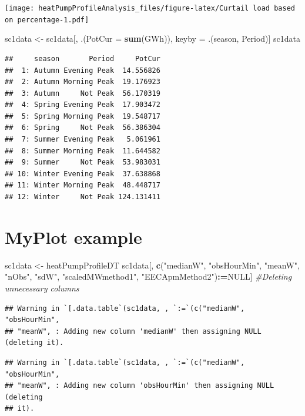 \documentclass[]{article}
\newenvironment{Shaded}{\begin{snugshade}}{\end{snugshade}}
\newcommand{\KeywordTok}[1]{\textcolor[rgb]{0.13,0.29,0.53}{\textbf{#1}}}
\newcommand{\DataTypeTok}[1]{\textcolor[rgb]{0.13,0.29,0.53}{#1}}
\newcommand{\StringTok}[1]{\textcolor[rgb]{0.31,0.60,0.02}{#1}}
\newcommand{\CommentTok}[1]{\textcolor[rgb]{0.56,0.35,0.01}{\textit{#1}}}
\newcommand{\OtherTok}[1]{\textcolor[rgb]{0.56,0.35,0.01}{#1}}
\newcommand{\OperatorTok}[1]{\textcolor[rgb]{0.81,0.36,0.00}{\textbf{#1}}}
\newcommand{\ErrorTok}[1]{\textcolor[rgb]{0.64,0.00,0.00}{\textbf{#1}}}
\newcommand{\NormalTok}[1]{#1}
\theoremstyle{definition}
\theoremstyle{definition}
\theoremstyle{definition}
\theoremstyle{remark}
\begin{document}
\texttt{[image: heatPumpProfileAnalysis\_files/figure-latex/Curtail load based on percentage-1.pdf]}

\begin{Shaded}
\begin{Highlighting}[]
\NormalTok{sc1data <-}\StringTok{ }\NormalTok{sc1data[, .(}\DataTypeTok{PotCur =} \KeywordTok{sum}\NormalTok{(GWh)),}
\NormalTok{                   keyby =}\StringTok{ }\NormalTok{.(season, Period)]}
\NormalTok{sc1data}
\end{Highlighting}
\end{Shaded}

\begin{verbatim}
##     season       Period     PotCur
##  1: Autumn Evening Peak  14.556826
##  2: Autumn Morning Peak  19.176923
##  3: Autumn     Not Peak  56.170319
##  4: Spring Evening Peak  17.903472
##  5: Spring Morning Peak  19.548717
##  6: Spring     Not Peak  56.386304
##  7: Summer Evening Peak   5.061961
##  8: Summer Morning Peak  11.644582
##  9: Summer     Not Peak  53.983031
## 10: Winter Evening Peak  37.638868
## 11: Winter Morning Peak  48.448717
## 12: Winter     Not Peak 124.131411
\end{verbatim}

\section{MyPlot example}\label{myplot-example}

\begin{Shaded}
\begin{Highlighting}[]
\NormalTok{sc1data <-}\StringTok{ }\NormalTok{heatPumpProfileDT}
\NormalTok{sc1data[, }\KeywordTok{c}\NormalTok{(}\StringTok{"medianW"}\NormalTok{, }\StringTok{"obsHourMin"}\NormalTok{, }\StringTok{"meanW"}\NormalTok{, }\StringTok{"nObs"}\NormalTok{, }\StringTok{"sdW"}\NormalTok{, }\StringTok{"scaledMWmethod1"}\NormalTok{, }\StringTok{"EECApmMethod2"}\NormalTok{)}\OperatorTok{:}\ErrorTok{=}\OtherTok{NULL}\NormalTok{] }\CommentTok{#Deleting unnecessary columns}
\end{Highlighting}
\end{Shaded}

\begin{verbatim}
## Warning in `[.data.table`(sc1data, , `:=`(c("medianW", "obsHourMin",
## "meanW", : Adding new column 'medianW' then assigning NULL (deleting it).
\end{verbatim}

\begin{verbatim}
## Warning in `[.data.table`(sc1data, , `:=`(c("medianW", "obsHourMin",
## "meanW", : Adding new column 'obsHourMin' then assigning NULL (deleting
## it).
\end{verbatim}
\end{document}

